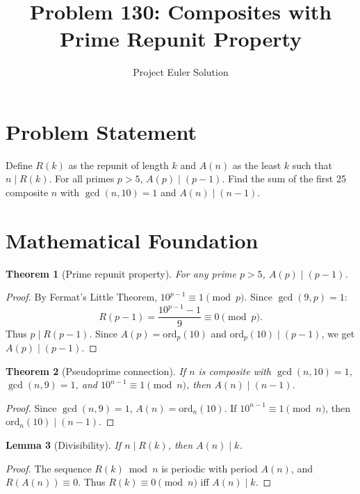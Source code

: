 \documentclass[11pt,a4paper]{article}
\title{Problem 130: Composites with Prime Repunit Property}
\author{Project Euler Solution}
\date{}
\newtheorem{theorem}{Theorem}
\newtheorem{lemma}[theorem]{Lemma}
\begin{document}
\maketitle

\section{Problem Statement}

Define $R(k)$ as the repunit of length $k$ and $A(n)$ as the least $k$ such that $n \mid R(k)$. For all primes $p > 5$, $A(p) \mid (p-1)$. Find the sum of the first 25 composite $n$ with $\gcd(n,10) = 1$ and $A(n) \mid (n-1)$.

\section{Mathematical Foundation}

\begin{theorem}[Prime repunit property]
For any prime $p > 5$, $A(p) \mid (p-1)$.
\end{theorem}

\begin{proof}
By Fermat's Little Theorem, $10^{p-1} \equiv 1 \pmod{p}$. Since $\gcd(9, p) = 1$:
\[
R(p-1) = \frac{10^{p-1} - 1}{9} \equiv 0 \pmod{p}.
\]
Thus $p \mid R(p-1)$. Since $A(p) = \mathrm{ord}_p(10)$ and $\mathrm{ord}_p(10) \mid (p-1)$, we get $A(p) \mid (p-1)$.
\end{proof}

\begin{theorem}[Pseudoprime connection]
If $n$ is composite with $\gcd(n, 10) = 1$, $\gcd(n, 9) = 1$, and $10^{n-1} \equiv 1 \pmod{n}$, then $A(n) \mid (n-1)$.
\end{theorem}

\begin{proof}
Since $\gcd(n,9) = 1$, $A(n) = \mathrm{ord}_n(10)$. If $10^{n-1} \equiv 1 \pmod{n}$, then $\mathrm{ord}_n(10) \mid (n-1)$.
\end{proof}

\begin{lemma}[Divisibility]
If $n \mid R(k)$, then $A(n) \mid k$.
\end{lemma}

\begin{proof}
The sequence $R(k) \bmod n$ is periodic with period $A(n)$, and $R(A(n)) \equiv 0$. Thus $R(k) \equiv 0 \pmod{n}$ iff $A(n) \mid k$.
\end{proof}
\end{document}
